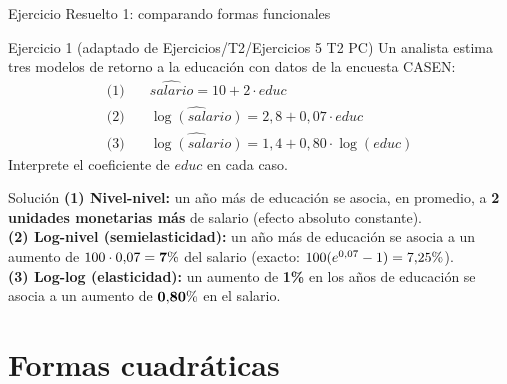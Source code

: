 \documentclass{beamer}
\newcommand{\pc}{\text{\char37}}
\begin{document}
\begin{frame}{Ejercicio Resuelto 1: comparando formas funcionales}

\begin{block}{Ejercicio 1 (adaptado de Ejercicios/T2/Ejercicios 5 T2 PC)}
Un analista estima tres modelos de retorno a la educación con datos de la encuesta CASEN:
\begin{align*}
\text{(1)}\quad & \widehat{salario} = 10 + 2\cdot educ \\
\text{(2)}\quad & \widehat{\log(salario)} = 2{,}8 + 0{,}07\cdot educ \\
\text{(3)}\quad & \widehat{\log(salario)} = 1{,}4 + 0{,}80\cdot \log(educ)
\end{align*}
Interprete el coeficiente de $educ$ en cada caso.
\end{block}

\pause

\begin{exampleblock}{Solución}
\textbf{(1) Nivel-nivel:} un año más de educación se asocia, en promedio, a \textbf{2 unidades monetarias más} de salario (efecto absoluto constante).\\
\textbf{(2) Log-nivel (semielasticidad):} un año más de educación se asocia a un aumento de $100\cdot 0{,}07 = \mathbf{7\pc}$ del salario (exacto: $100(e^{0{,}07}-1)=7{,}25\pc$).\\
\textbf{(3) Log-log (elasticidad):} un aumento de \textbf{1\%} en los años de educación se asocia a un aumento de $\mathbf{0{,}80\pc}$ en el salario.
\end{exampleblock}

\end{frame}

\section{Formas cuadráticas}
\end{document}
